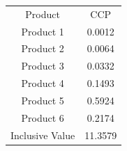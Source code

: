 \begin{tabular}{cc}
Product & CCP \\
Product 1 & 0.0012 \\
Product 2 & 0.0064 \\
Product 3 & 0.0332 \\
Product 4 & 0.1493 \\
Product 5 & 0.5924 \\
Product 6 & 0.2174 \\
Inclusive Value & 11.3579 \\
\end{tabular}